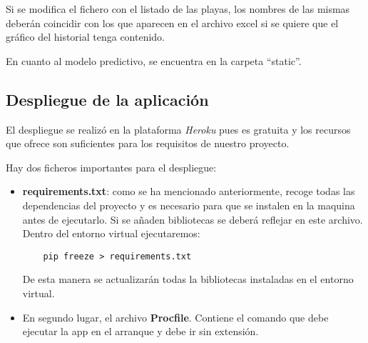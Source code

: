 Si se modifica el fichero con el listado de las playas, los nombres de las mismas deberán coincidir con los que aparecen en el archivo excel si se quiere que el gráfico del historial tenga contenido.

En cuanto al modelo predictivo, se encuentra en la carpeta ``static''.

\subsection{Despliegue de la aplicación}

El despliegue se realizó en la plataforma \emph{Heroku} pues es gratuita y los recursos que ofrece son suficientes para los requisitos de nuestro proyecto.

Hay dos ficheros importantes para el despliegue:
\begin{itemize}
	\item \textbf{requirements.txt}: como se ha mencionado anteriormente, recoge todas las dependencias del proyecto y es necesario para que se instalen en la maquina antes de ejecutarlo. Si se añaden bibliotecas se deberá reflejar en este archivo. Dentro del entorno virtual ejecutaremos:
	\begin{verbatim}
	pip freeze > requirements.txt
	\end{verbatim}
	De esta manera se actualizarán todas la bibliotecas instaladas en el entorno virtual.
	\item En segundo lugar, el archivo \textbf{Procfile}. Contiene el comando que debe ejecutar la app en el arranque y debe ir sin extensión.
\end{itemize}


